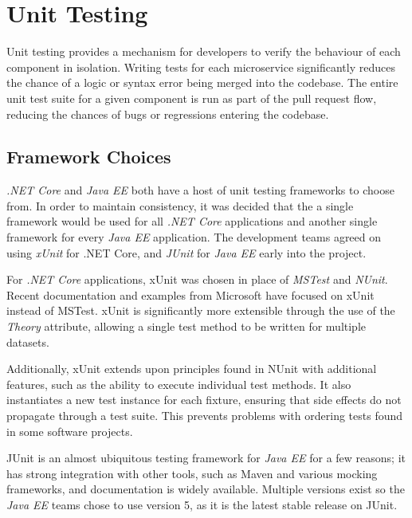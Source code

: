 \section{Unit Testing}
\par
Unit testing provides a mechanism for developers to verify the behaviour of each component in isolation. Writing tests for each microservice significantly reduces the chance of a logic or syntax error being merged into the codebase. The entire unit test suite for a given component is run as part of the pull request flow, reducing the chances of bugs or regressions entering the codebase.

\par
\subsection{Framework Choices}
\textit{.NET Core} and \textit{Java EE} both have a host of unit testing frameworks to choose from. In order to maintain consistency, it was decided that the a single framework would be used for all \textit{.NET Core} applications and another single framework for every \textit{Java EE} application. The development teams agreed on using \textit{xUnit}\cite{xUnit} for .NET Core, and \textit{JUnit}\cite{JUnit} for \textit{Java EE} early into the project.

\par
For \textit{.NET Core} applications, xUnit was chosen in place of \textit{MSTest} and \textit{NUnit}. Recent documentation and examples from Microsoft have focused on xUnit instead of MSTest. xUnit is significantly more extensible through the use of the \textit{Theory} attribute, allowing a single test method to be written for multiple datasets.

\par
Additionally, xUnit extends upon principles found in NUnit with additional features, such as the ability to execute individual test methods\cite{Nunit_XUnit_comparison}. It also instantiates a new test instance for each fixture, ensuring that side effects do not propagate through a test suite. This prevents problems with ordering tests found in some software projects.

\par
JUnit is an almost ubiquitous testing framework for \textit{Java EE} for a few reasons; it has strong integration with other tools, such as Maven and various mocking frameworks, and documentation is widely available. Multiple versions exist so the \textit{Java EE} teams chose to use version 5, as it is the latest stable release on JUnit.

